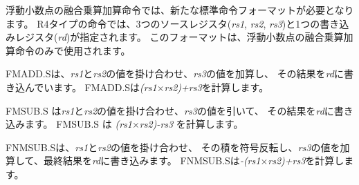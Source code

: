 {\begin{comment}
Floating-point fused multiply-add instructions require a new standard
instruction format.  R4-type instructions specify three source
registers ({\em rs1}, {\em rs2}, and {\em rs3}) and a destination
register ({\em rd}).  This format is only used by the floating-point
fused multiply-add instructions.
\end{comment}

浮動小数点の融合乗算加算命令では、新たな標準命令フォーマットが必要となります。
R4タイプの命令では、3つのソースレジスタ({\em rs1}, {\em rs2}, {\em rs3})と1つの書き込みレジスタ({\em rd})が指定されます。
このフォーマットは、浮動小数点の融合乗算加算命令のみで使用されます。

\begin{comment}
FMADD.S multiplies the values in {\em
rs1} and {\em rs2}, adds the value in {\em rs3}, and writes the final
result to {\em rd}.  FMADD.S computes {\em (rs1$\times$rs2)+rs3}.
\end{comment}

FMADD.Sは、{\em rs1}と{\em rs2}の値を掛け合わせ、{\em rs3}の値を加算し、
その結果を{\em rd}に書き込んでいます。
FMADD.Sは{\em (rs1$\times$rs2)+rs3}を計算します。

\begin{comment}
FMSUB.S multiplies the values in {\em rs1} and {\em rs2}, subtracts
the value in {\em rs3}, and writes the final result to {\em rd}.
FMSUB.S computes {\em (rs1$\times$rs2)-rs3}.
\end{comment}

FMSUB.S は{\em rs1}と{\em rs2}の値を掛け合わせ、{\em rs3}の値を引いて、
その結果を{\em rd}に書き込みます。
FMSUB.S は {\em (rs1$\times$rs2)-rs3} を計算します。

\begin{comment}
FNMSUB.S multiplies the
values in {\em rs1} and {\em rs2}, negates the product, adds the value
in {\em rs3}, and writes the final result to {\em rd}. FNMSUB.S
computes {\em -(rs1$\times$rs2)+rs3}.
\end{comment}

FNMSUB.Sは、{\em rs1}と{\em rs2}の値を掛け合わせ、
その積を符号反転し、{\em rs3}の値を加算して、最終結果を{\em rd}に書き込みます。
FNMSUB.Sは{\em -(rs1$\times$rs2)+rs3}を計算します。

\begin{comment}
FNMADD.S multiplies the values
in {\em rs1} and {\em rs2}, negates the product, subtracts the value
in {\em rs3}, and writes the final result to {\em rd}. FNMADD.S
computes {\em -(rs1$\times$rs2)-rs3}.
\end{comment}

}
